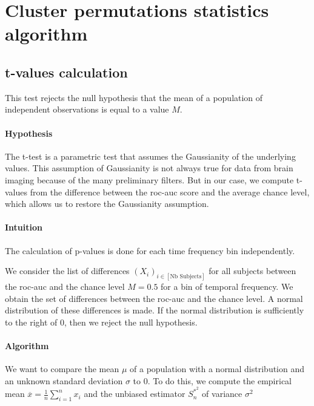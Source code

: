 \section{Cluster permutations statistics algorithm}

\subsection{t-values calculation}

This test rejects the null hypothesis that the mean of a population of independent observations is equal to a value $M$.

\paragraph{Hypothesis}

The t-test is a parametric test that assumes the Gaussianity of the underlying values. This assumption of Gaussianity is not always true for data from brain imaging because of the many preliminary filters. But in our case, we compute t-values from the difference between the roc-auc score and the average chance level, which allows us to restore the Gaussianity assumption.

\paragraph{Intuition}

The calculation of p-values is done for each time frequency bin independently.

We consider the list of differences $(X_i)_{i \in [\text{Nb Subjects}]}$ for all subjects between the roc-auc and the chance level $M=0.5$ for a bin of temporal frequency. We obtain the set of differences between the roc-auc and the chance level. A normal distribution of these differences is made. If the normal distribution is sufficiently to the right of 0, then we reject the null hypothesis.

\paragraph{Algorithm}

We want to compare the mean $\mu$ of a population with a normal distribution and an unknown standard deviation $\sigma$ to $0$. To do this, we compute the empirical mean $\overline{x} = \frac{1}{n}\sum_{i=1}^{n}x_i$ and the unbiased estimator $S^{\ast ^2}_n$ of variance $\sigma^2$


